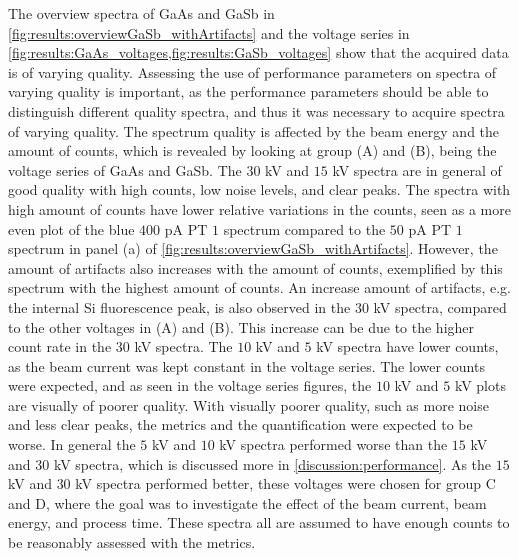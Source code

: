 The overview spectra of GaAs and GaSb in \cref{fig:results:overviewGaSb_withArtifacts} and the voltage series in \cref{fig:results:GaAs_voltages,fig:results:GaSb_voltages} show that the acquired data is of varying quality.
Assessing the use of performance parameters on spectra of varying quality is important, as the performance parameters should be able to distinguish different quality spectra, and thus it was necessary to acquire spectra of varying quality.
The spectrum quality is affected by the beam energy and the amount of counts, which is revealed by looking at group (A) and (B), being the voltage series of GaAs and GaSb.
The $30$ kV and $15$ kV spectra are in general of good quality with high counts, low noise levels, and clear peaks.
The spectra with high amount of counts have lower relative variations in the counts, seen as a more even plot of the blue $400$ pA PT $1$ spectrum compared to the $50$ pA PT $1$ spectrum in panel (a) of \cref{fig:results:overviewGaSb_withArtifacts}.
However, the amount of artifacts also increases with the amount of counts, exemplified by this spectrum with the highest amount of counts.
An increase amount of artifacts, e.g. the internal Si fluorescence peak, is also observed in the $30$ kV spectra, compared to the other voltages in (A) and (B).
This increase can be due to the higher count rate in the $30$ kV spectra.
The $10$ kV and $5$ kV spectra have lower counts, as the beam current was kept constant in the voltage series.
The lower counts were expected, and as seen in the voltage series figures, the $10$ kV and $5$ kV plots are visually of poorer quality.
With visually poorer quality, such as more noise and less clear peaks, the metrics and the quantification were expected to be worse.
In general the $5$ kV and $10$ kV spectra performed worse than the $15$ kV and $30$ kV spectra, which is discussed more in \cref{discussion:performance}.
As the $15$ kV and $30$ kV spectra performed better, these voltages were chosen for group C and D, where the goal was to investigate the effect of the beam current, beam energy, and process time.
These spectra all are assumed to have enough counts to be reasonably assessed with the metrics.


